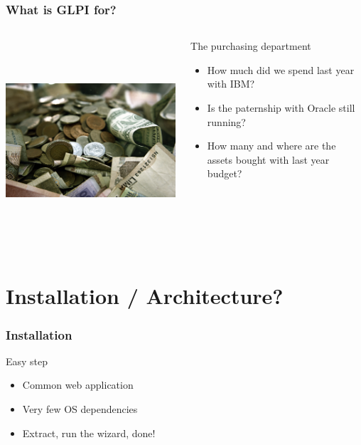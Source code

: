 \documentclass{beamer}
\begin{document}
\begin{frame}
    \frametitle{What is GLPI for?}

 \begin{columns}
 \begin{column}{0.35\textwidth}
         \includegraphics[height=7.5cm]{./pics/purchasing.jpg}
 \end{column}
 \begin{column}{0.65\textwidth}
    \begin{block}{The purchasing department}
        \begin{itemize}
            \item How much did we spend last year with IBM?
            \item Is the paternship with Oracle still running?
            \item How many and where are the assets bought with last year budget?
        \end{itemize}
    \end{block}
 \end{column}
\end{columns}
\end{frame}


\section{Installation / Architecture?}


\begin{frame}
    \frametitle{Installation}

    \begin{block}{Easy step}
        \begin{itemize}
            \item Common web application
            \item Very few OS dependencies
            \item Extract, run the wizard, done!
        \end{itemize}
    \end{block}


\end{frame}
\end{document}
